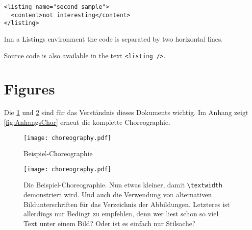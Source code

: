 \begin{Listing}
  \begin{lstlisting}
<listing name="second sample">
  <content>not interesting</content>
</listing>
\end{lstlisting}
  \caption{Inn a Listings environment the code is separated by two horizontal lines.}
  \label{lst:ListingANDlstlisting}
\end{Listing}

Source code is also available in the text \lstinline|<listing />|.
\section{Figures}
Die \cref{fig:chor1} und \ref{fig:chor2} sind für das Verständnis dieses Dokuments wichtig.
Im Anhang zeigt \vref{fig:AnhangsChor} erneut die komplette Choreographie.

\begin{figure}
  \centering
  \texttt{[image: choreography.pdf]}
  \caption{Beispiel-Choreographie}
  \label{fig:chor1}
\end{figure}

\begin{figure}
  \centering
  \texttt{[image: choreography.pdf]}
  \caption[Beispiel-Choreographie]{Die Beispiel-Choreographie. Nun etwas kleiner, damit \texttt{\textbackslash textwidth} demonstriert wird. Und auch die Verwendung von alternativen Bildunterschriften für das Verzeichnis der Abbildungen. Letzteres ist allerdings nur Bedingt zu empfehlen, denn wer liest schon so viel Text unter einem Bild? Oder ist es einfach nur Stilsache?}
  \label{fig:chor2}
\end{figure}


